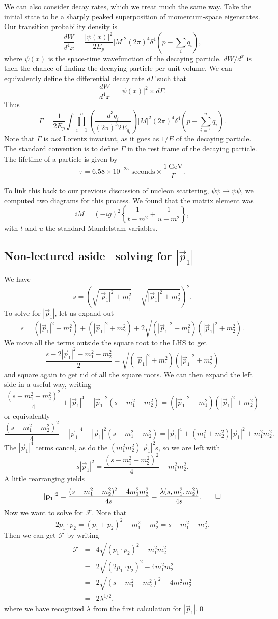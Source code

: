 We can also consider decay rates, which we treat much the same way. Take the initial state to be a sharply peaked superposition of momentum-space eigenstates. Our transition probability density is
$$\frac{dW}{d^4x}=\frac{|\psi(x)|^2}{2E_p} |M|^2(2\pi)^4\delta^4(p-\sum_i q_i),$$
where $\psi(x)$ is the space-time wavefunction of the decaying particle. $dW/d^x$ is then the chance of finding the decaying particle per unit volume. We can equivalently define the differential decay rate $d\Gamma$ such that
$$\frac{dW}{d^4x}=|\psi(x)|^2 \times d\Gamma.$$
Thus
$$\Gamma=\frac{1}{2E_p}\int \prod_{i=1}^n \left(\frac{d^3 q_i}{(2\pi)^3 2E_{q_i}}\right)|M|^2(2\pi)^4 \delta^4(p-\sum_{i=1}^n q_i).$$
Note that $\Gamma$ is \emph{not} Lorentz invariant, as it goes as $1/E$ of the decaying particle. The standard convention is to define $\Gamma$ in the rest frame of the decaying particle. The lifetime of a particle is given by 
$$\tau=6.58\times 10^{-25}\text{ seconds}\times \frac{\SI{1}{\giga\electronvolt}}{\Gamma}.$$

To link this back to our previous discussion of nucleon scattering, $\psi\psi \to \psi\psi$, we computed two diagrams for this process. We found that the matrix element was
$$iM=(-ig)^2\left\{\frac{1}{t-m^2}+\frac{1}{u-m^2}\right\},$$
with $t$ and $u$ the standard Mandelstam variables. 

\subsection*{Non-lectured aside-- solving for $|\vec p_1|$} We have 
$$s=\left(\sqrt{|\vec p_1|^2+m_1^2}+\sqrt{|\vec p_1|^2+m_2^2}\right)^2.$$
To solve for $|\vec p_1|$, let us expand out 
$$s=(|\vec p_1|^2+m_1^2)+(|\vec p_1|^2+m_2^2)+2\sqrt{(|\vec p_1|^2+m_1^2)(|\vec p_1|^2+m_2^2)}.$$
We move all the terms outside the square root to the LHS to get
$$\frac{s-2|\vec p_1|^2-m_1^2-m_2^2}{2}=\sqrt{(|\vec p_1|^2+m_1^2)(|\vec p_1|^2+m_2^2)}$$
and square again to get rid of all the square roots. We can then expand the left side in a useful way, writing
$$\frac{(s-m_1^2-m_2^2)^2}{4}+|\vec p_1|^4 -|\vec p_1|^2(s-m_1^2-m_2^2)=(|\vec p_1|^2+m_1^2)(|\vec p_1|^2+m_2^2)$$
or equivalently
$$\frac{(s-m_1^2-m_2^2)^2}{4}+|\vec p_1|^4 -|\vec p_1|^2(s-m_1^2-m_2^2)=|\vec p_1|^4 +(m_1^2+m_2^2)|\vec p_1|^2 +m_1^2m_2^2.$$
The $|\vec p_1|^4$ terms cancel, as do the $(m_1^2m_2^2)|\vec p_1|^2$s, so we are left with
$$s|\vec p_1|^2 =\frac{(s-m_1^2-m_2^2)^2}{4}-m_1^2m_2^2.$$
A little rearranging yields
$$|\vec p_1|^2 =\frac{(s-m_1^2-m_2^2)^2-4m_1^2 m_2^2}{4s}=\frac{\lambda(s,m_1^2,m_2^2)}{4s}.\qed$$
Now we want to solve for $\mathcal{F}$. Note that
$$2p_1\cdot p_2 = (p_1+p_2)^2-m_1^2-m_2^2=s-m_1^2-m_2^2.$$
Then we can get $\mathcal{F}$ by writing
\begin{eqnarray*}
\mathcal{F}&=&4\sqrt{(p_1\cdot p_2)^2-m_1^2m_2^2}\\
&=&2\sqrt{(2p_1\cdot p_2)^2-4m_1^2m_2^2}\\
&=&2\sqrt{(s-m_1^2-m_2^2)^2-4m_1^2m_2^2}\\
&=&2\lambda^{1/2},
\end{eqnarray*}
where we have recognized $\lambda$ from the first calculation for $|\vec p_1|.$\qed